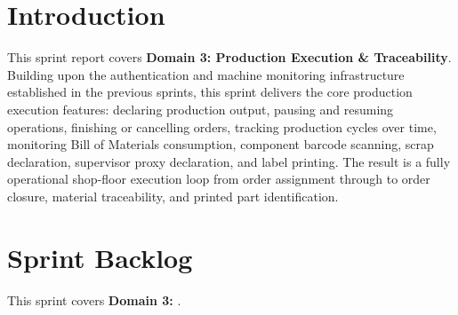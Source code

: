 \minitoc
\newpage

\section*{Introduction}

This sprint report covers \textbf{Domain 3: Production Execution \& Traceability}.
Building upon the authentication and machine monitoring infrastructure established
in the previous sprints, this sprint delivers the core production execution
features: declaring production output, pausing and resuming operations, finishing
or cancelling orders, tracking production cycles over time, monitoring Bill of
Materials consumption, component barcode scanning, scrap declaration, supervisor
proxy declaration, and label printing. The result is a fully operational shop-floor
execution loop from order assignment through to order closure, material traceability,
and printed part identification.

\section{Sprint Backlog}

This sprint covers \textbf{Domain 3:} \textbf{}.

